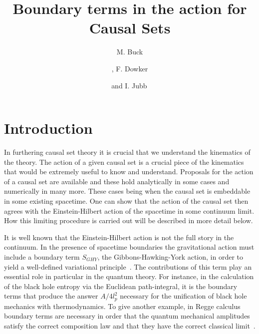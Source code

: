 \documentclass[12pt]{article}
\title{Boundary terms in the action for Causal Sets}
\author[a]{M. Buck}
\author[a,b]{\!, F. Dowker}
\author[a]{and I. Jubb\,}
\affiliation[a]{Theoretical Physics Group, Blackett Laboratory, Imperial College, London, SW7 2AZ, U.K.}
\affiliation[b]{Institute for Quantum Computing, University of Waterloo, ON, N2L 2Y5, Canada}
\newcommand{\mb}[1]{\marginnote{\texttt{\small MB:\,#1}}}
\begin{document}
\maketitle

\section{Introduction}


In furthering causal set theory it is crucial that we understand the kinematics of the theory. The action of a given causal set is a crucial piece of the kinematics that would be extremely useful to know and understand. Proposals for the action of a causal set are available \cite{Benincasa_Dowker:The_Scalar_Curvature_of_a_Causal_Set} and these hold analytically in some cases and numerically in many more.\mb{rephrase} These cases being when the causal set is embeddable in some existing spacetime. One can show that the action of the causal set then agrees with the Einstein-Hilbert action of the spacetime in some continuum limit. How this limiting procedure is carried out will be described in more detail below.

It is well known that the Einstein-Hilbert action is not the full story in the continuum. In the presence of spacetime boundaries the gravitational action must include a boundary term $S_{GHY}$, the Gibbons-Hawking-York action, in order to yield a well-defined variational principle~\cite{Gibbons_Hawking_Boundary}. The contributions of this term play an essential role in particular in the quantum theory. For instance, in the calculation of the black hole entropy via the Euclidean path-integral, it is the boundary terms that produce the answer $A/4l_p^2$ necessary for the unification of black hole mechanics with thermodynamics. To give another example, in Regge calculus boundary terms are necessary in order that the quantum mechanical amplitudes satisfy the correct composition law and that they have the correct classical limit~\cite{hartlesorkin}.\mb{is this true?}
\end{document}
